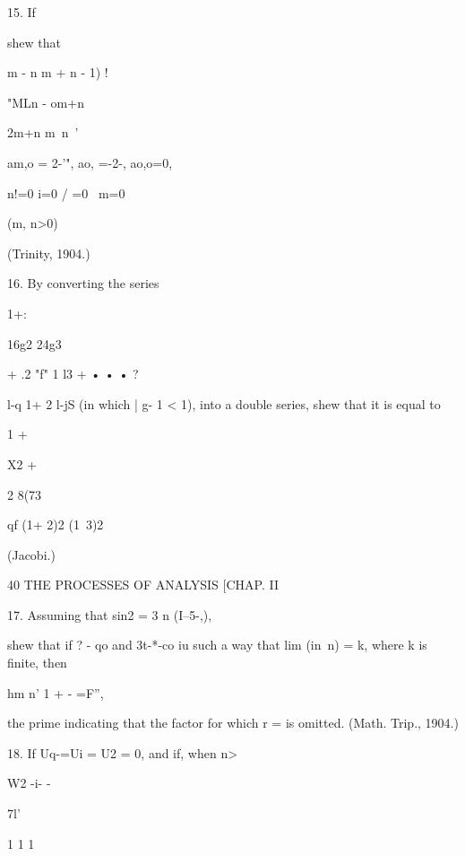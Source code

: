 15. If

shew that



m - n m + n - 1) !



"MLn - om+n



2m+n m\ n\ '

am,o = 2-'", ao, =-2-, ao,o=0,



n!=0 i=0 / =0 \ m=0



(m, n>0)



(Trinity, 1904.)



16. By converting the series

1+:



16g2 24g3

+ .2 "f" 1 l3 + • • • ?



l-q 1+ 2 l-jS (in which | g- 1 < 1), into a double series, shew that
it is equal to



1 +



X2 +



2 8(73



  qf (1+ 2)2 (1\ 3)2



(Jacobi.)



40 THE PROCESSES OF ANALYSIS [CHAP. II

17. Assuming that sin2 = 3 n (I--5-,),

shew that if ? - qo and 3t-*-co iu such a way that lim (in\ n) = k,
where k is finite, then

hm n' 1 + - =F'',



the prime indicating that the factor for which r = is omitted. (Math.
Trip., 1904.)

18. If Uq-=Ui = U2 = 0, and if, when n>\,



W2 -i- -



 7l'



1 1 1

